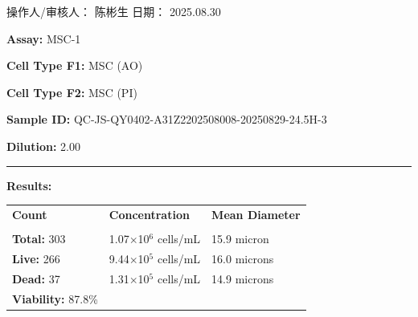 \documentclass[UTF8,10pt,a4paper,fontset=fandol]{ctexart}
\renewcommand{\arraystretch}{1.15}
\newcommand{\fieldvalue}[1]{#1}
\newcommand{\handwritten}[1]{#1}
\begin{document}
\vfill

\noindent 操作人/审核人：
\fieldvalue{\handwritten{陈彬生}}
\hfill
日期：
\fieldvalue{\handwritten{2025.08.30}}

\newpage

\noindent\textbf{Assay:} %
\fieldvalue{MSC-1}

\medskip
\noindent\textbf{Cell Type F1:} %
\fieldvalue{MSC (AO)}

\noindent\textbf{Cell Type F2:} %
\fieldvalue{MSC (PI)}

\medskip
\noindent\textbf{Sample ID:} %
\fieldvalue{QC-JS-QY0402-A31Z2202508008-20250829-24.5H-3}

\noindent\textbf{Dilution:} %
\fieldvalue{2.00}

\medskip
\hrule
\medskip

\noindent\textbf{Results:}

\medskip
\renewcommand{\arraystretch}{1.15}
\begin{tabularx}{\textwidth}{@{}>{\raggedright\arraybackslash}X
>{\raggedright\arraybackslash}X
>{\raggedright\arraybackslash}X@{}}
\textbf{Count} & \textbf{Concentration} & \textbf{Mean Diameter} \\
\underline{\hspace{1.25cm}} & \underline{\hspace{1.65cm}} & \underline{\hspace{1.75cm}} \\

\textbf{Total:} %
\fieldvalue{303}
&
\fieldvalue{1.07$\times$10$^{6}$ cells/mL}
&
\fieldvalue{15.9 micron}
\\

\textbf{Live:} %
\fieldvalue{266}
&
\fieldvalue{9.44$\times$10$^{5}$ cells/mL}
&
\fieldvalue{16.0 microns}
\\

\textbf{Dead:} %
\fieldvalue{37}
&
\fieldvalue{1.31$\times$10$^{5}$ cells/mL}
&
\fieldvalue{14.9 microns}
\\

\textbf{Viability:} %
\fieldvalue{87.8\%}
&
&
\end{tabularx}
\end{document}
